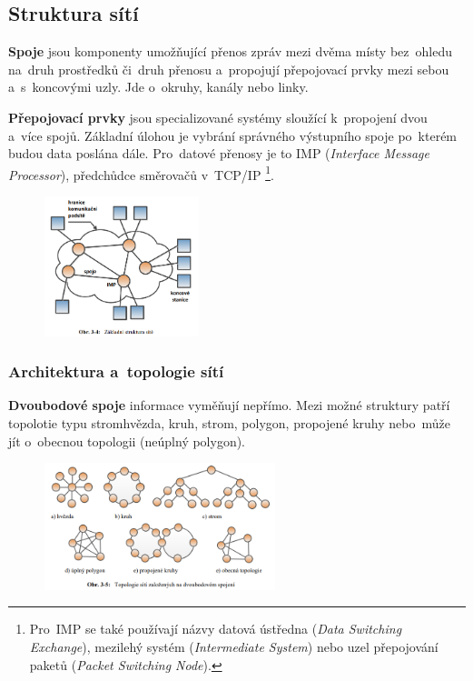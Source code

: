 \subsection{Struktura sítí}

\textbf{Spoje} jsou komponenty umožňující přenos zpráv mezi dvěma místy bez~ohledu na~druh prostředků či~druh přenosu a~propojují přepojovací prvky mezi sebou a~s~koncovými uzly. Jde o~okruhy, kanály nebo linky.

\textbf{Přepojovací prvky} jsou specializované systémy sloužící k~propojení dvou a~více spojů. Základní úlohou je vybrání správného výstupního spoje po~kterém budou data poslána dále. Pro~datové přenosy je to IMP (\emph{Interface Message Processor}), předchůdce směrovačů v~TCP/IP%
\footnote{Pro~IMP se také používají názvy datová ústředna (\emph{Data Switching Exchange}), mezilehý systém (\emph{Intermediate System}) nebo uzel přepojování paketů (\emph{Packet Switching Node}).}.

\begin{figure}[ht]
	\centering
	\includegraphics[width=0.4\textwidth]{images/q01_imp}
\end{figure}

\subsubsection{Architektura a~topologie sítí}

\textbf{Dvoubodové spoje} informace vyměňují nepřímo. Mezi možné struktury patří topolotie typu stromhvězda, kruh, strom, polygon, propojené kruhy nebo~může jít o~obecnou topologii (neúplný polygon).

\begin{figure}[ht]
	\centering
	\includegraphics[width=0.6\textwidth]{images/q01_network_topology}
\end{figure}

